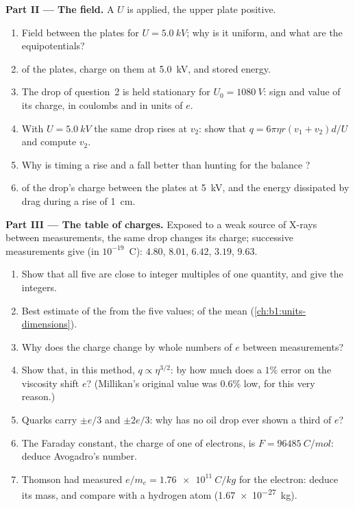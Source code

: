 \begin{problem}
\medskip
\noindent\textbf{Part II --- The field.}
A  $U$ is applied, the upper plate positive.
\begin{enumerate}[resume]
  \item Field between the plates for $U = \qty{5.0}{kV}$; why is it
        uniform, and what are the equipotentials?
  \item {} of the plates, charge on them at \qty{5.0}{kV}, and
        stored energy.
  \item The drop of question~2 is held stationary for $U_0 = \qty{1080}{V}$:
        sign and value of its charge, in coulombs and in units of $e$.
  \item With $U = \qty{5.0}{kV}$ the same drop rises at $v_2$: show that
        $q = 6\pi\eta r(v_1 + v_2)d/U$ and compute $v_2$.
  \item Why is timing a rise and a fall better than hunting for the
        balance ?
  \item {} of the drop's charge between the plates at
        \qty{5}{kV}, and the energy dissipated by drag during a rise of
        \qty{1}{cm}.
\end{enumerate}

\medskip
\noindent\textbf{Part III --- The table of charges.}
Exposed to a weak source of X-rays between measurements, the same drop
changes its charge; successive measurements give (in $10^{-19}$~C):
$4.80$, $8.01$, $6.42$, $3.19$, $9.63$.
\begin{enumerate}[resume]
  \item Show that all five are close to integer multiples of one
        quantity, and give the integers.
  \item Best estimate of the  from the five values;
         of the mean (\cref{ch:b1:units-dimensions}).
  \item Why does the charge change by whole numbers of $e$ between
        measurements?
  \item Show that, in this method, $q \propto \eta^{3/2}$: by how much does
        a $1\%$ error on the viscosity shift $e$? (Millikan's original
        value was $0.6\%$ low, for this very reason.)
  \item Quarks carry $\pm e/3$ and $\pm 2e/3$: why has no oil drop ever
        shown a third of $e$?
  \item The Faraday constant, the charge of one  of electrons, is
        $F = \qty{96485}{C/mol}$: deduce Avogadro's number.
  \item Thomson had measured $e/m_e = \qty{1.76e11}{C/kg}$ for the
        electron: deduce its mass, and compare with a hydrogen atom
        (\qty{1.67e-27}{kg}).
\end{enumerate}


\end{problem}

